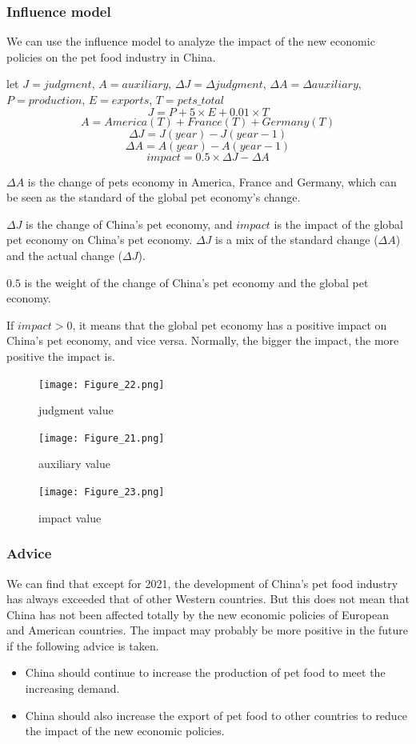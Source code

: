 \documentclass[withoutpreface,bwprint]{cumcmthesis} %
\begin{document}
\subsubsection{Influence model}
\par We can use the influence model to analyze the impact of the new economic policies on the pet food industry in China.
\begin{definition}[impact]
    let \(J=judgment\), \(A=auxiliary\), \(\Delta J=\Delta judgment\), \(\Delta A=\Delta auxiliary\),
    \(P=production\), \(E=exports\), \(T=pets\_total\)
    \[J = P + 5 \times E + 0.01\times T\]
    \[A = America(T) + France(T) + Germany(T)\]
    \[\Delta J = J(year) - J(year-1)\]
    \[\Delta A = A(year) - A(year-1)\]
    \[impact = 0.5 \times \Delta J - \Delta A\]
\end{definition}
\par \(\Delta A\) is the change of pets economy in America, France and Germany, which can be seen as the standard of the global pet economy's change.
\par \(\Delta J\) is the change of China's pet economy, and \(impact\) is the impact of the global pet economy on China's pet economy.
\(\Delta J\) is a mix of the standard change (\(\Delta A\)) and the actual change (\(\Delta J\)).
\par \(0.5\) is the weight of the change of China's pet economy and the global pet economy.
\par If \(impact > 0\), it means that the global pet economy has a positive impact on China's pet economy, and vice versa.
Normally, the bigger the impact, the more positive the impact is.
\begin{figure}[htbp]
	\centering
	\texttt{[image: Figure\_22.png]}
	\caption{judgment value}
\end{figure}
\begin{figure}[htbp]
	\centering
	\texttt{[image: Figure\_21.png]}
	\caption{auxiliary value}
\end{figure}
\clearpage
\begin{figure}[htbp]
	\centering
	\texttt{[image: Figure\_23.png]}
	\caption{impact value}
\end{figure}

\subsubsection{Advice}
\par We can find that except for 2021, the development of China's pet food industry has always exceeded that of other Western countries.
But this does not mean that China has not been affected totally by the new economic policies of European and American countries.
The impact may probably be more positive in the future if the following advice is taken.
\begin{itemize}
    \item China should continue to increase the production of pet food to meet the increasing demand.
    \item China should also increase the export of pet food to other countries to reduce the impact of the new economic policies.
\end{itemize}
\end{document}
